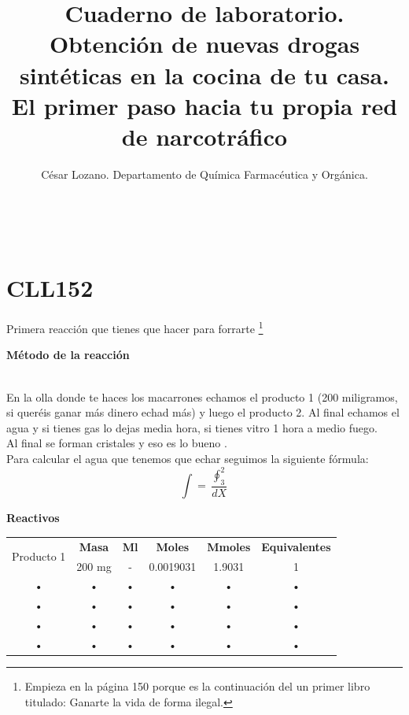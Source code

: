 \documentclass[a4paper]{book}
\author{César Lozano. Departamento de Química Farmacéutica y Orgánica.}
\title{\textbf{Cuaderno de laboratorio.}\\ Obtención de nuevas drogas sintéticas en la cocina de tu casa. El primer paso hacia tu propia red de narcotráfico}
\begin{document}
\maketitle

\thispagestyle{empty}
$\ $

\tableofcontents

\setcounter{page}{150}

\chapter{CLL152}
\begin{center}
\begin{huge}
Primera reacción que tienes que hacer para forrarte
\footnote{Empieza en la página 150 porque es la continuación del un primer libro titulado: Ganarte la vida de forma ilegal.}
\end{huge}
\end{center}

\begin{large}
\textbf{Método de la reacción} \\
\end{large}
\\
En la olla donde te haces los macarrones echamos el producto 1 (200 miligramos, si queréis ganar más dinero echad más) y luego el producto 2. Al final echamos el agua y si tienes gas lo dejas media hora, si tienes vitro 1 hora a medio fuego.
\\
Al final se forman cristales y eso es lo bueno \cite{2}.
\\
Para calcular el agua que tenemos que echar seguimos la siguiente fórmula:
\begin{equation}
\int = \dfrac{\oint^2_3}{dX}
\end{equation}


\begin{large}
\textbf{Reactivos} 
\end{large}
\begin{table}[htb]
\centering
\begin{tabular}{|c|c|c|c|c|c|}
\hline 
\multirow{2}{1.5cm}{Producto 1} & \textbf{Masa} & \textbf{Ml} & \textbf{Moles} & \textbf{Mmoles} & \textbf{Equivalentes} \\ \cline{2-6} 
& 200 mg & - & 0.0019031 & 1.9031 & 1 \\ 
\hline 
• & • & • & • & • & • \\ 
\hline 
• & • & • & • & • & • \\ 
\hline 
• & • & • & • & • & • \\ 
\hline 
• & • & • & • & • & • \\ 
\hline 
\end{tabular} 
\end{table}
\end{document}

